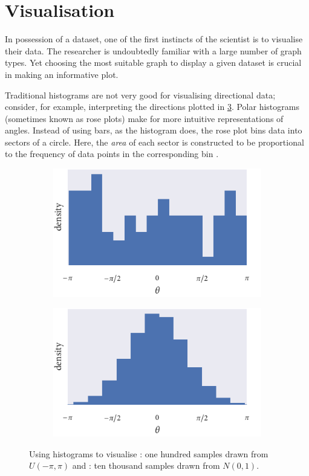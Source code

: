 \section{Visualisation}
\label{sec:circular_visualisation}

In possession of a dataset, one of the first instincts of the scientist is to
visualise their data. The researcher is undoubtedly familiar with a large
number of graph types. Yet choosing the most suitable graph to display a given
dataset is crucial in making an informative plot.

Traditional histograms are not very good for visualising directional data;
consider, for example, interpreting the directions plotted in
\cref{fig:angle_hist}. Polar histograms (sometimes known as rose plots) make
for more intuitive representations of angles. Instead of using bars, as the
histogram does, the rose plot bins data into sectors of a circle. Here, the
\emph{area} of each sector is constructed to be proportional to the frequency
of data points in the corresponding bin \parencite{mardia09}.

\begin{figure}[tb]
	\begin{subfigure}[b]{0.5\textwidth}
		\includegraphics{uniform_hist.pdf}
		\caption{}
		\label{subfig:unif_angle_hist}
	\end{subfigure}%
	\begin{subfigure}[b]{0.5\textwidth}
		\includegraphics{normal_hist.pdf}
		\caption{}
		\label{subfig:norm_angle_hist}
	\end{subfigure}
    \caption{Using histograms to visualise : one
      hundred samples drawn from $U(-\pi, \pi)$ and
      : ten thousand samples drawn from $N(0, 1)$.}
	\label{fig:angle_hist}
\end{figure}

